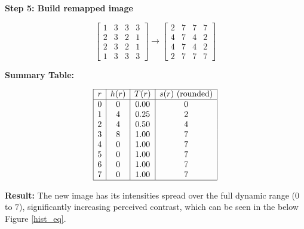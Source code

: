 {\textbf{Step 5: Build remapped image}

\[
\begin{bmatrix}
1 & 3 & 3 & 3 \\
2 & 3 & 2 & 1 \\
2 & 3 & 2 & 1 \\
1 & 3 & 3 & 3
\end{bmatrix}
\longrightarrow
\begin{bmatrix}
2 & 7 & 7 & 7 \\
4 & 7 & 4 & 2 \\
4 & 7 & 4 & 2 \\
2 & 7 & 7 & 7
\end{bmatrix}
\]

\textbf{Summary Table:}

\[
\begin{array}{|c|c|c|c|}
\hline
r & h(r) & T(r) & s(r)\ (\text{rounded}) \\
\hline
0 & 0 & 0.00 & 0 \\
1 & 4 & 0.25 & 2 \\
2 & 4 & 0.50 & 4 \\
3 & 8 & 1.00 & 7 \\
4 & 0 & 1.00 & 7 \\
5 & 0 & 1.00 & 7 \\
6 & 0 & 1.00 & 7 \\
7 & 0 & 1.00 & 7 \\
\hline
\end{array}
\]

\textbf{Result:}
The new image has its intensities spread over the full dynamic range ($0$ to $7$), significantly increasing perceived contrast, which can be seen in the below Figure \ref{hist_eq}.


}
